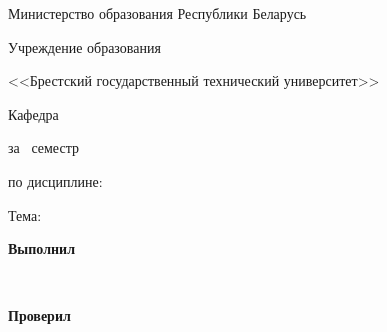 \begin{center}
    Министерство образования Республики Беларусь

    Учреждение образования

    <<Брестский государственный технический университет>>

    Кафедра \titlePageKafedra
\end{center}

\vfill

\begin{center}
    \titlePageTypeWork

    за \titlePageSemestr~семестр

    по дисциплине: {\bfseries \titlePageSubject}

    Тема: \titlePageTopic
\end{center}

\vfill

\begin{flushright}
    \begin{minipage}[tl]{7cm}
        \textbf{Выполнил}

        \smallskip

        \titlePageStudentType

        \titlePageStudentSurname~\titlePageStudentName

        \bigskip

        \textbf{Проверил}

        \smallskip

        \titlePageTeacherSurname~\titlePageTeacherName
    \end{minipage}
\end{flushright}

\vfill

\begin{center}
    \titlePageCity~\the\year{}
\end{center}
